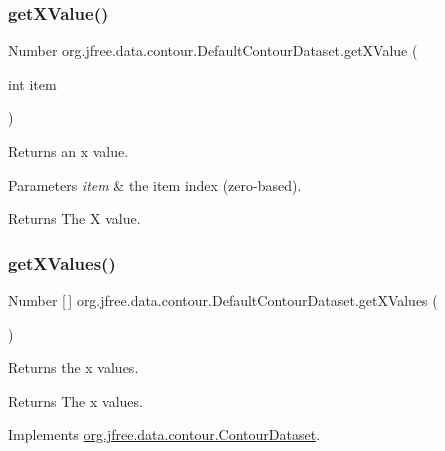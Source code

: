 \subsubsection{\texorpdfstring{get\+X\+Value()}{getXValue()}}
{\footnotesize\ttfamily Number org.\+jfree.\+data.\+contour.\+Default\+Contour\+Dataset.\+get\+X\+Value (\begin{DoxyParamCaption}\item[{int}]{item }\end{DoxyParamCaption})}

Returns an x value.


\begin{DoxyParams}{Parameters}
{\em item} & the item index (zero-\/based).\\
\hline
\end{DoxyParams}
\begin{DoxyReturn}{Returns}
The X value. 
\end{DoxyReturn}
\mbox{\label{classorg_1_1jfree_1_1data_1_1contour_1_1_default_contour_dataset_a8a4966b63f2a288bf72c93d8c00341b7}} 
\subsubsection{\texorpdfstring{get\+X\+Values()}{getXValues()}}
{\footnotesize\ttfamily Number \mbox{[}$\,$\mbox{]} org.\+jfree.\+data.\+contour.\+Default\+Contour\+Dataset.\+get\+X\+Values (\begin{DoxyParamCaption}{ }\end{DoxyParamCaption})}

Returns the x values.

\begin{DoxyReturn}{Returns}
The x values. 
\end{DoxyReturn}


Implements \mbox{\hyperlink{interfaceorg_1_1jfree_1_1data_1_1contour_1_1_contour_dataset_ad7a2140d12c0543a8178c8aafc4b3475}{org.\+jfree.\+data.\+contour.\+Contour\+Dataset}}.

\mbox{\label{classorg_1_1jfree_1_1data_1_1contour_1_1_default_contour_dataset_a8afdda497f72a548bbc43a066f86a28b}} 
